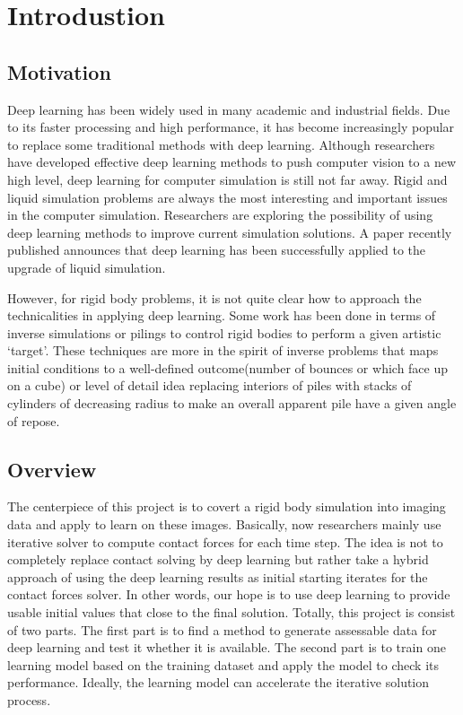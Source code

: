 \chapter{Introdustion}

\section{Motivation}

    Deep learning has been widely used in many academic and industrial fields. Due to its faster processing and high performance, it has become increasingly popular to replace some traditional methods with deep learning. Although researchers have developed effective deep learning methods to push computer vision to a new high level, deep learning for computer simulation is still not far away. Rigid and liquid simulation problems are always the most interesting and important issues in the computer simulation. Researchers are exploring the possibility of using deep learning methods to improve current simulation solutions. A paper recently published announces that deep learning has been successfully applied to the upgrade of liquid simulation\cite{CNNFluid2016}.

    However, for rigid body problems, it is not quite clear how to approach the technicalities in applying deep learning. Some work has been done in terms of inverse simulations or pilings to control rigid bodies to perform a given artistic `target'. These techniques are more in the spirit of inverse problems that maps initial conditions to a well-defined outcome(number of bounces or which face up on a cube) or level of detail idea replacing interiors of piles with stacks of cylinders of decreasing radius to make an overall apparent pile have a given angle of repose.



\section{Overview}
        The centerpiece of this project is to covert a rigid body simulation into imaging data and apply to learn on these images. Basically, now researchers mainly use iterative solver to compute contact forces for each time step. The idea is not to completely replace contact solving by deep learning but rather take a hybrid approach of using the deep learning results as initial starting iterates for the contact forces solver. In other words, our hope is to use deep learning to provide usable initial values that close to the final solution. Totally, this project is consist of two parts. The first part is to find a method to generate assessable data for deep learning and test it whether it is available. The second part is to train one learning model based on the training dataset and apply the model to check its performance. Ideally, the learning model can accelerate the iterative solution process.

